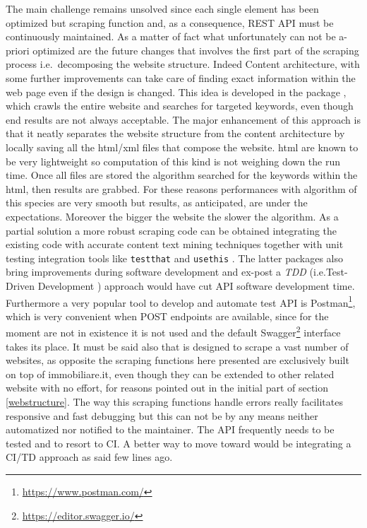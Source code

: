\documentclass[
  12pt,
  a4paper,
  oneside]{book}
\DeclareRobustCommand{\href}[2]{#2\footnote{\url{#1}}}
\theoremstyle{definition}
\theoremstyle{definition}
\theoremstyle{definition}
\theoremstyle{remark}
\begin{document}
The main challenge remains unsolved since each single element has been optimized but scraping function and, as a consequence, REST API must be continuously maintained. As a matter of fact what unfortunately can not be a-priori optimized are the future changes that involves the first part of the scraping process i.e.~decomposing the website structure. Indeed Content architecture, with some further improvements can take care of finding exact information within the web page even if the design is changed. This idea is developed in the package \citet{Rcrawler}, which crawls the entire website and searches for targeted keywords, even though end results are not always acceptable. The major enhancement of this approach is that it neatly separates the website structure from the content architecture by locally saving all the html/xml files that compose the website. html are known to be very lightweight so computation of this kind is not weighing down the run time. Once all files are stored the algorithm searched for the keywords within the html, then results are grabbed. For these reasons performances with algorithm of this species are very smooth but results, as anticipated, are under the expectations. Moreover the bigger the website the slower the algorithm.
As a partial solution a more robust scraping code can be obtained integrating the existing code with accurate content text mining techniques together with unit testing integration tools like \texttt{testthat} \citet{testthat} and \texttt{usethis} \citet{usethis}. The latter packages also bring improvements during software development and ex-post a \emph{TDD} (i.e.Test-Driven Development \citet{TDD_2004}) approach would have cut API software development time. Furthermore a very popular tool to develop and automate test API is \href{https://www.postman.com/}{Postman}, which is very convenient when POST endpoints are available, since for the moment are not in existence it is not used and the default \href{https://editor.swagger.io/}{Swagger} interface takes its place.
It must be said also that \citet{Rcrawler} is designed to scrape a vast number of websites, as opposite the scraping functions here presented are exclusively built on top of immobiliare.it, even though they can be extended to other related website with no effort, for reasons pointed out in the initial part of section \ref{webstructure}.
The way this scraping functions handle errors really facilitates responsive and fast debugging but this can not be by any means neither automatized nor notified to the maintainer. The API frequently needs to be tested and to resort to CI. A better way to move toward would be integrating a CI/TD approach as said few lines ago.
\end{document}

